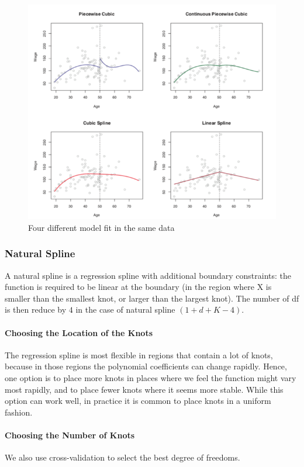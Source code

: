 \begin{figure}[!ht]
    \centering
    \includegraphics[scale=0.6]{src/StatisticalLearning/NonLinearModelComparaison.png}
    \caption{Four different model fit in the same data}
\end{figure}

\subsubsection{Natural Spline}
A natural spline is a regression spline with additional boundary constraints: the function is required to be linear at the boundary (in the region where X is smaller than the smallest knot, or larger than the largest knot). The number of df is then reduce by $4$ in the case of natural spline $(1 + d + K - 4)$.

\paragraph{Choosing the Location of the Knots}
The regression spline is most flexible in regions that contain a lot of knots, because in those regions the polynomial coefficients can change rapidly. Hence, one option is to place more knots in places where we feel the function might vary most rapidly, and to place fewer knots where it seems more stable. While this option can work well, in practice it is common to place knots in a uniform fashion.

\paragraph{Choosing the Number of Knots}
We also use cross-validation to select the best degree of freedoms.

